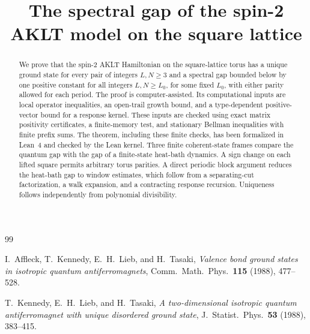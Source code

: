 \documentclass[11pt,reqno]{amsart}
\theoremstyle{plain}
\theoremstyle{definition}
\theoremstyle{remark}
\numberwithin{equation}{section}
\begin{document}
\title{The spectral gap of the spin-2 AKLT model on the square lattice}

\begin{abstract}
We prove that the spin-2 AKLT Hamiltonian on the square-lattice torus
has a unique ground state for every pair of integers $L,N\ge3$ and a
spectral gap bounded below by one positive constant for all integers
$L,N\ge L_0$, for some fixed $L_0$, with either parity allowed for
each period. The proof is computer-assisted. Its computational inputs
are local operator inequalities, an open-trail growth bound, and a
type-dependent positive-vector bound for a response kernel. These
inputs are checked using exact matrix positivity certificates, a
finite-memory test, and stationary Bellman inequalities with finite
prefix sums. The theorem, including these finite checks, has been
formalized in Lean~4 and checked by the Lean kernel.
Three finite coherent-state frames compare the quantum gap with the
gap of a finite-state heat-bath dynamics. A sign change on each lifted
square permits arbitrary torus parities. A direct periodic block
argument reduces the heat-bath gap to window estimates, which follow
from a separating-cut factorization, a walk expansion, and a
contracting response recursion. Uniqueness follows independently from
polynomial divisibility.
\end{abstract}

\maketitle
\setcounter{tocdepth}{1}
\tableofcontents










\appendix





\begin{thebibliography}{99}

I.~Affleck, T.~Kennedy, E.~H.~Lieb, and H.~Tasaki,
\emph{Valence bond ground states in isotropic quantum antiferromagnets},
Comm.\ Math.\ Phys.\ \textbf{115} (1988), 477--528.

T.~Kennedy, E.~H.~Lieb, and H.~Tasaki,
\emph{A two-dimensional isotropic quantum antiferromagnet with unique disordered ground state},
J.\ Statist.\ Phys.\ \textbf{53} (1988), 383--415.

\end{thebibliography}
\end{document}
